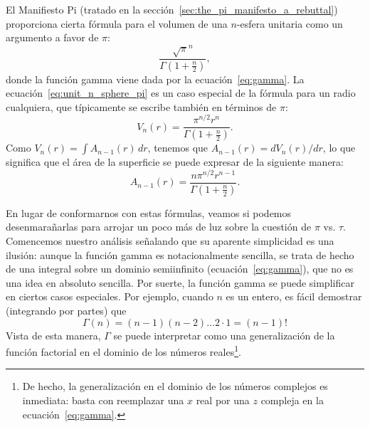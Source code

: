 El Manifiesto Pi (tratado en la sección~\ref{sec:the_pi_manifesto_a_rebuttal}) proporciona cierta fórmula para el volumen de una $n$-esfera unitaria como un argumento a favor de $\pi$:
\begin{equation}
\label{eq:unit_n_sphere_pi}
\frac{\sqrt{\pi}^{n} }{\Gamma(1 + \frac{n}{2})},
\end{equation}
donde la función gamma viene dada por la ecuación~\eqref{eq:gamma}. La ecuación~\eqref{eq:unit_n_sphere_pi} es un caso especial de la fórmula para un radio cualquiera, que típicamente se escribe también en términos de $\pi$:
\begin{equation}
\label{eq:n_sphere_pi}
V_n(r) = \frac{\pi^{n/2} r^n}{\Gamma(1 + \frac{n}{2})}.
\end{equation}
Como $V_n(r) = \int A_{n-1}(r)\,dr$, tenemos que $A_{n-1}(r) = dV_n(r)/dr$, lo que significa que el área de la superficie se puede expresar de la siguiente manera:
\begin{equation}
\label{eq:n_sphere_pi_r}
A_{n-1}(r) = \frac{n \pi^{n/2} r^{n-1}}{\Gamma(1 + \frac{n}{2})}.
\end{equation}

En lugar de conformarnos con estas fórmulas, veamos si podemos desenmarañarlas para arrojar un poco más de luz sobre la cuestión de $\pi$ vs. $\tau$. Comencemos nuestro análisis señalando que su aparente simplicidad es una ilusión: aunque la función gamma es notacionalmente sencilla, se trata de hecho de una integral sobre un dominio semiinfinito (ecuación~\eqref{eq:gamma}), que no es una idea en absoluto sencilla. Por suerte, la función gamma se puede simplificar en ciertos casos especiales. Por ejemplo, cuando $n$ es un entero, es fácil demostrar (integrando por partes) que
\[
\Gamma(n) = (n-1)(n-2)\ldots 2\cdot 1 = (n-1)!
\]
Vista de esta manera, $\Gamma$ se puede interpretar como una generalización de la función factorial en el dominio de los números reales\footnote{De hecho, la generalización en el dominio de los números complejos es inmediata: basta con reemplazar una $x$ real por una $z$ compleja en la ecuación~\eqref{eq:gamma}.}.

